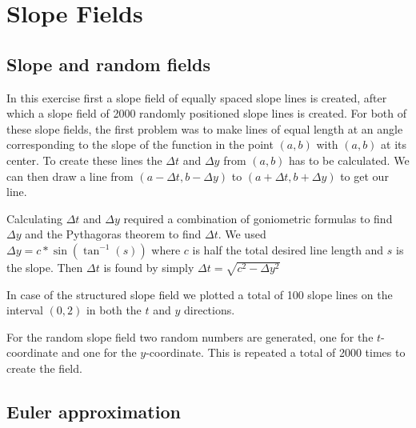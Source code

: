 \documentclass[a4paper,12px]{article}
\begin{document}
\section{Slope Fields}
\subsection{Slope and random fields}

In this exercise first a slope field of equally spaced slope lines is created,
after which a slope field of 2000 randomly positioned slope lines is created.
For both of these slope fields, the first problem was to make lines of equal
length at an angle corresponding to the slope of the function in the point
$(a,b)$ with $(a,b)$ at its center. To create these lines the $\Delta t$ and
$\Delta y$ from $(a,b)$ has to be calculated. We can then draw a line from
$(a-\Delta t, b-\Delta y)$ to $(a+\Delta t, b+\Delta y)$ to get our line.

Calculating $\Delta t$ and $\Delta y$ required a combination of goniometric
formulas to find $\Delta y$ and the Pythagoras theorem to find $\Delta t$.  We
used $\Delta y = c*\sin(\tan^{-1}(s))$ where $c$ is half the total
desired line length and $s$ is the slope. Then $\Delta t$ is found by simply
$\Delta t= \sqrt{c^2-\Delta y^2}$

In case of the structured slope field we plotted a total of 100 slope lines on
the interval $(0,2)$ in both the $t$ and $y$ directions.

For the random slope field two random numbers are generated, one for the
$t$-coordinate and one for the $y$-coordinate. This is repeated a total of 2000
times to create the field.

\subsection{Euler approximation}



%
%
\end{document}

